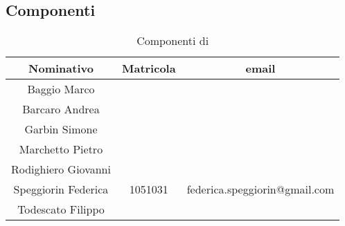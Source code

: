\subsection{Componenti}

\begin{table}[H]
  \centering
  \begin{tabular}{|c|c|c|}
  \hline
  \textbf{Nominativo} &
  \textbf{Matricola} &
  \textbf{email}\\
  \hline
  Baggio Marco &  &  \\
  \hline
  Barcaro Andrea &  &  \\
  \hline
  Garbin Simone &  &  \\
  \hline
  Marchetto Pietro &  & \\
  \hline
  Rodighiero Giovanni &  &\\
  \hline
  Speggiorin Federica & 1051031 & federica.speggiorin@gmail.com\\
  \hline
  Todescato Filippo &  & \\
  \hline
  \end{tabular}
  \caption{Componenti di \GroupName}
\end{table}






